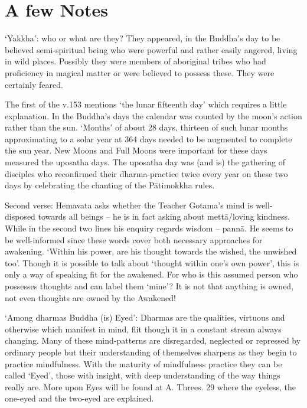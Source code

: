  \begin{MyDescription}[(Sn. 152 –- 180)]{}
 \end{MyDescription}  								
\newpage
\section{A few Notes}

`Yakkha': who or what are they? They appeared, in the Buddha's day to be believed semi-spiritual being who were powerful and rather easily angered, living in wild places. Possibly they were members of aboriginal tribes who had proficiency in magical matter or were believed to possess these. They were certainly feared.
   
The first of the v.153 mentions `the lunar fifteenth day' which requires a little explanation. In the Buddha's days the calendar was counted by the moon's action rather than the sun. `Months' of about 28 days, thirteen of such lunar months approximating to a solar year at 364 days needed to be augmented to complete the sun year. New Moons and Full Moons were important for these days measured the uposatha days. The uposatha day was (and is) the gathering of disciples who reconfirmed their dharma-practice twice every year on these two days by celebrating the chanting of the P\=atimokkha rules.
   
Second verse: Hemavata asks whether the Teacher Gotama's mind is well- disposed towards all beings – he is in fact asking about mett\=a/loving kindness. While in the second two lines his enquiry regards wisdom – pann\=a. He seems to be well-informed since these words cover both necessary approaches for awakening. `Within his power, are his thought towards the wished, the unwished too'. Though it is possible to talk about `thought within one's own power', this is only a way of speaking fit for the awakened. For who is this assumed person who possesses thoughts and can label them `mine'? It is not that anything is owned, not even thoughts are owned by the Awakened!
   
`Among dharmas Buddha (is) Eyed': Dharmas are the qualities, virtuous and otherwise which manifest in mind, flit though it in a constant stream always changing. Many of these mind-patterns are disregarded, neglected or repressed by ordinary people but their understanding of themselves sharpens as they begin to practice mindfulness. With the maturity of mindfulness practice they can be called `Eyed', those with insight, with deep understanding of the way things really are. More upon Eyes will be found at A. Threes. 29 where the eyeless, the one-eyed and the two-eyed are explained.
   
